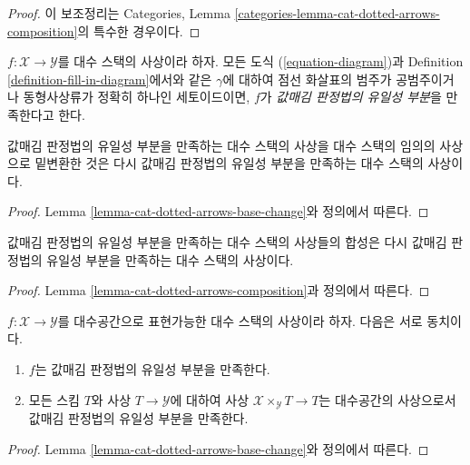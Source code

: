 \begin{proof}
이 보조정리는 Categories, Lemma
\ref{categories-lemma-cat-dotted-arrows-composition}의 특수한 경우이다.
\end{proof}

\begin{definition}
\label{definition-uniqueness}
$f : \mathcal{X} \to \mathcal{Y}$를 대수 스택의 사상이라 하자.
모든 도식 (\ref{equation-diagram})과 Definition
\ref{definition-fill-in-diagram}에서와 같은 $\gamma$에 대하여 점선
화살표의 범주가
공범주이거나 동형사상류가 정확히 하나인 세토이드이면, $f$가
{\it 값매김 판정법의 유일성 부분}을 만족한다고 한다.
\end{definition}

\begin{lemma}
\label{lemma-base-change-uniqueness}
값매김 판정법의 유일성 부분을 만족하는 대수 스택의 사상을 대수 스택의
임의의 사상으로 밑변환한 것은 다시 값매김 판정법의 유일성 부분을
만족하는 대수 스택의 사상이다.
\end{lemma}

\begin{proof}
Lemma \ref{lemma-cat-dotted-arrows-base-change}와 정의에서 따른다.
\end{proof}

\begin{lemma}
\label{lemma-composition-uniqueness}
값매김 판정법의 유일성 부분을 만족하는 대수 스택의 사상들의 합성은 다시
값매김 판정법의 유일성 부분을 만족하는 대수 스택의 사상이다.
\end{lemma}

\begin{proof}
Lemma \ref{lemma-cat-dotted-arrows-composition}과 정의에서 따른다.
\end{proof}

\begin{lemma}
\label{lemma-uniqueness-representable}
$f : \mathcal{X} \to \mathcal{Y}$를 대수공간으로 표현가능한 대수 스택의
사상이라 하자. 다음은 서로 동치이다.
\begin{enumerate}
\item $f$는 값매김 판정법의 유일성 부분을 만족한다.
\item 모든 스킴 $T$와 사상 $T \to \mathcal{Y}$에 대하여 사상
$\mathcal{X} \times_\mathcal{Y} T \to T$는 대수공간의 사상으로서
값매김 판정법의 유일성 부분을 만족한다.
\end{enumerate}
\end{lemma}

\begin{proof}
Lemma \ref{lemma-cat-dotted-arrows-base-change}와 정의에서 따른다.
\end{proof}


